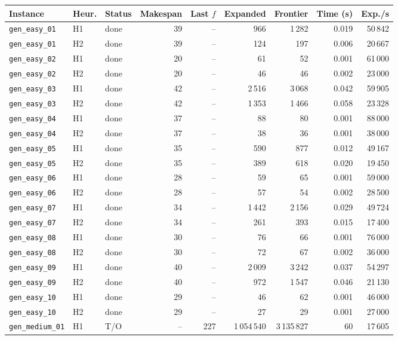 \begin{tabular}{lllrrrrrr}
\toprule
Instance & Heur. & Status & Makespan & Last $f$ & Expanded & Frontier & Time (s) & Exp./s \\
\midrule
\texttt{gen\_easy\_01} & H1 & done & 39 & -- & 966 & 1\,282 & 0.019 & 50\,842 \\
\texttt{gen\_easy\_01} & H2 & done & 39 & -- & 124 & 197 & 0.006 & 20\,667 \\
\texttt{gen\_easy\_02} & H1 & done & 20 & -- & 61 & 52 & 0.001 & 61\,000 \\
\texttt{gen\_easy\_02} & H2 & done & 20 & -- & 46 & 46 & 0.002 & 23\,000 \\
\texttt{gen\_easy\_03} & H1 & done & 42 & -- & 2\,516 & 3\,068 & 0.042 & 59\,905 \\
\texttt{gen\_easy\_03} & H2 & done & 42 & -- & 1\,353 & 1\,466 & 0.058 & 23\,328 \\
\texttt{gen\_easy\_04} & H1 & done & 37 & -- & 88 & 80 & 0.001 & 88\,000 \\
\texttt{gen\_easy\_04} & H2 & done & 37 & -- & 38 & 36 & 0.001 & 38\,000 \\
\texttt{gen\_easy\_05} & H1 & done & 35 & -- & 590 & 877 & 0.012 & 49\,167 \\
\texttt{gen\_easy\_05} & H2 & done & 35 & -- & 389 & 618 & 0.020 & 19\,450 \\
\texttt{gen\_easy\_06} & H1 & done & 28 & -- & 59 & 65 & 0.001 & 59\,000 \\
\texttt{gen\_easy\_06} & H2 & done & 28 & -- & 57 & 54 & 0.002 & 28\,500 \\
\texttt{gen\_easy\_07} & H1 & done & 34 & -- & 1\,442 & 2\,156 & 0.029 & 49\,724 \\
\texttt{gen\_easy\_07} & H2 & done & 34 & -- & 261 & 393 & 0.015 & 17\,400 \\
\texttt{gen\_easy\_08} & H1 & done & 30 & -- & 76 & 66 & 0.001 & 76\,000 \\
\texttt{gen\_easy\_08} & H2 & done & 30 & -- & 72 & 67 & 0.002 & 36\,000 \\
\texttt{gen\_easy\_09} & H1 & done & 40 & -- & 2\,009 & 3\,242 & 0.037 & 54\,297 \\
\texttt{gen\_easy\_09} & H2 & done & 40 & -- & 972 & 1\,547 & 0.046 & 21\,130 \\
\texttt{gen\_easy\_10} & H1 & done & 29 & -- & 46 & 62 & 0.001 & 46\,000 \\
\texttt{gen\_easy\_10} & H2 & done & 29 & -- & 27 & 29 & 0.001 & 27\,000 \\
\texttt{gen\_medium\_01} & H1 & T/O & -- & 227 & 1\,054\,540 & 3\,135\,827 & 60 & 17\,605 \\

\end{tabular}
